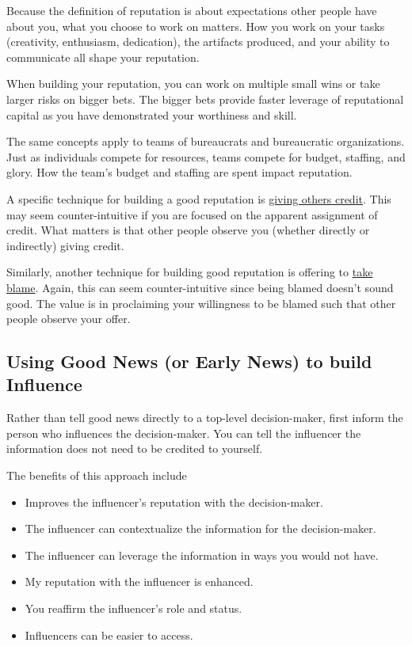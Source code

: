 Because the definition of reputation is about expectations other people have about you, what you choose to work on matters. How you work on your tasks (creativity, enthusiasm, dedication), the artifacts produced, and your ability to communicate all shape your reputation. 

When building your reputation, you can work on multiple small wins or take larger risks on bigger bets. The bigger bets provide faster leverage of reputational capital as you have demonstrated your worthiness and skill. 

The same concepts apply to teams of bureaucrats and bureaucratic organizations. Just as individuals compete for resources, teams compete for budget, staffing, and glory. How the team's budget and staffing are spent impact reputation. 

A specific technique for building a good reputation is 
\hyperref[sec:credit-others]{giving others credit}. 
This may seem counter-intuitive if you are focused on the apparent assignment of credit. What  matters is that other people observe you (whether directly or indirectly) giving credit. 

Similarly, another technique for building good reputation is offering to \hyperref[sec:take-blame]{take blame}.
Again, this can seem counter-intuitive since being blamed doesn't sound good. The value is in proclaiming your willingness to be blamed such that other people observe your offer. 

\subsection*{Using Good News (or Early News) to build Influence}

Rather than tell good news directly to a top-level decision-maker, first inform the person who influences the decision-maker.
You can tell the influencer the information does not need to be credited to yourself.

The benefits of this approach include
\begin{itemize}
    \item Improves the influencer's reputation with the decision-maker.
    \item The influencer can contextualize the information for the decision-maker.
    \item The influencer can leverage the information in ways you would not have.
    \item My reputation with the influencer is enhanced.
    \item You reaffirm the influencer's role and status.
    \item Influencers can be easier to access.
\end{itemize}

